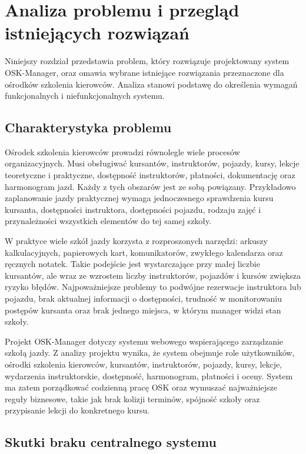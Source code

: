 \chapter{Analiza problemu i przegląd istniejących rozwiązań}
\label{cha:analizaProblemu}

Niniejszy rozdział przedstawia problem, który rozwiązuje projektowany system OSK-Manager, oraz omawia wybrane istniejące rozwiązania przeznaczone dla ośrodków szkolenia kierowców. Analiza stanowi podstawę do określenia wymagań funkcjonalnych i niefunkcjonalnych systemu.

\section{Charakterystyka problemu}
\label{sec:charakterystykaProblemu}

Ośrodek szkolenia kierowców prowadzi równolegle wiele procesów organizacyjnych. Musi obsługiwać kursantów, instruktorów, pojazdy, kursy, lekcje teoretyczne i praktyczne, dostępność instruktorów, płatności, dokumentację oraz harmonogram jazd. Każdy z tych obszarów jest ze sobą powiązany. Przykładowo zaplanowanie jazdy praktycznej wymaga jednoczesnego sprawdzenia kursu kursanta, dostępności instruktora, dostępności pojazdu, rodzaju zajęć i przynależności wszystkich elementów do tej samej szkoły.

W praktyce wiele szkół jazdy korzysta z rozproszonych narzędzi: arkuszy kalkulacyjnych, papierowych kart, komunikatorów, zwykłego kalendarza oraz ręcznych notatek. Takie podejście jest wystarczające przy małej liczbie kursantów, ale wraz ze wzrostem liczby instruktorów, pojazdów i kursów zwiększa ryzyko błędów. Najpoważniejsze problemy to podwójne rezerwacje instruktora lub pojazdu, brak aktualnej informacji o dostępności, trudność w monitorowaniu postępów kursanta oraz brak jednego miejsca, w którym manager widzi stan szkoły.

Projekt OSK-Manager dotyczy systemu webowego wspierającego zarządzanie szkołą jazdy. Z analizy projektu wynika, że system obejmuje role użytkowników, ośrodki szkolenia kierowców, kursantów, instruktorów, pojazdy, kursy, lekcje, wydarzenia instruktorskie, dostępność, harmonogram, płatności i oceny. System ma zatem porządkować codzienną pracę OSK oraz wymuszać najważniejsze reguły biznesowe, takie jak brak kolizji terminów, spójność szkoły oraz przypisanie lekcji do konkretnego kursu.

\section{Skutki braku centralnego systemu}
\label{sec:skutkiBrakuSystemu}

